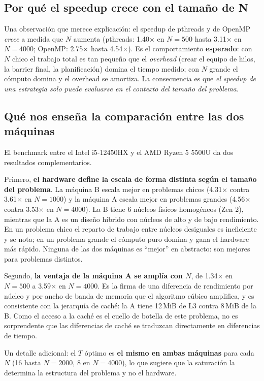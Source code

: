 \subsection{Por qué el speedup crece con el tamaño de N}

Una observación que merece explicación: el speedup de pthreads y de OpenMP \emph{crece} a medida que $N$ aumenta (pthreads: 1.40$\times$ en $N=500$ hasta 3.11$\times$ en $N=4000$; OpenMP: 2.75$\times$ hasta 4.54$\times$). Es el comportamiento \textbf{esperado}: con $N$ chico el trabajo total es tan pequeño que el \emph{overhead} (crear el equipo de hilos, la barrier final, la planificación) domina el tiempo medido; con $N$ grande el cómputo domina y el overhead se amortiza. La consecuencia es que \emph{el speedup de una estrategia solo puede evaluarse en el contexto del tamaño del problema}.

\subsection{Qué nos enseña la comparación entre las dos máquinas}

El benchmark entre el Intel i5-12450HX y el AMD Ryzen 5 5500U da dos resultados complementarios.

Primero, \textbf{el hardware define la escala de forma distinta según el tamaño del problema}. La máquina B escala mejor en problemas chicos (4.31$\times$ contra 3.61$\times$ en $N=1000$) y la máquina A escala mejor en problemas grandes (4.56$\times$ contra 3.53$\times$ en $N=4000$). La B tiene 6 núcleos físicos homogéneos (Zen 2), mientras que la A es un diseño híbrido con núcleos de alto y de bajo rendimiento. En un problema chico el reparto de trabajo entre núcleos desiguales es ineficiente y se nota; en un problema grande el cómputo puro domina y gana el hardware más rápido. Ninguna de las dos máquinas es ``mejor'' en abstracto: son mejores para problemas distintos.

Segundo, \textbf{la ventaja de la máquina A se amplía con $N$}, de 1.34$\times$ en $N=500$ a 3.59$\times$ en $N=4000$. Es la firma de una diferencia de rendimiento por núcleo y por ancho de banda de memoria que el algoritmo cúbico amplifica, y es consistente con la jerarquía de caché: la A tiene 12\,MiB de L3 contra 8\,MiB de la B. Como el acceso a la caché es el cuello de botella de este problema, no es sorprendente que las diferencias de caché se traduzcan directamente en diferencias de tiempo.

Un detalle adicional: el $T$ óptimo es \textbf{el mismo en ambas máquinas} para cada $N$ (16 hasta $N=2000$, 8 en $N=4000$), lo que sugiere que la saturación la determina la estructura del problema y no el hardware.

